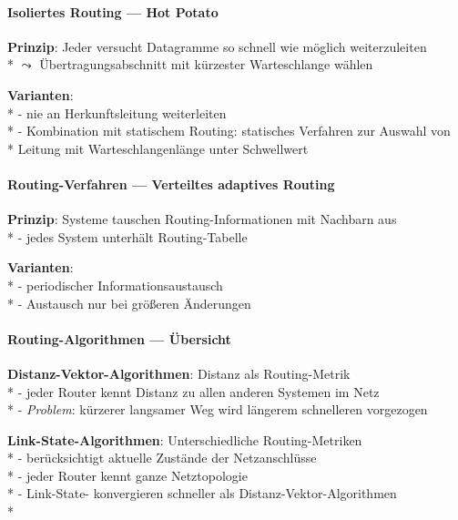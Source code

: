 \paragraph{Isoliertes Routing --- Hot Potato}
\begin{items}
  \item \textbf{Prinzip}: Jeder versucht Datagramme so schnell wie möglich weiterzuleiten \\*
    \( \leadsto \) Übertragungsabschnitt mit kürzester Warteschlange wählen
  \item \textbf{Varianten}: \\*
    - nie an Herkunftsleitung weiterleiten \\*
    - Kombination mit statischem Routing: statisches Verfahren zur Auswahl von \\* \phantom{-} \phantom{\( \cdot \)} Leitung mit Warteschlangenlänge unter Schwellwert
\end{items}

\paragraph{Routing-Verfahren --- Verteiltes adaptives Routing}
\begin{items}
  \item \textbf{Prinzip}: Systeme tauschen Routing-Informationen mit Nachbarn aus \\*
    - jedes System unterhält Routing-Tabelle
  \item \textbf{Varianten}: \\*
    - periodischer Informationsaustausch \\*
    - Austausch nur bei größeren Änderungen
\end{items}

\paragraph{Routing-Algorithmen --- Übersicht}
\begin{items}
  \item \textbf{Distanz-Vektor-Algorithmen}: Distanz als Routing-Metrik \\*
    - jeder Router kennt Distanz zu allen anderen Systemen im Netz \\*
    - \emph{Problem}: kürzerer langsamer Weg wird längerem schnelleren vorgezogen
  \item \textbf{Link-State-Algorithmen}: Unterschiedliche Routing-Metriken \\*
    - berücksichtigt aktuelle Zustände der Netzanschlüsse \\*
    - jeder Router kennt ganze Netztopologie \\*
    - Link-State- konvergieren schneller als Distanz-Vektor-Algorithmen \\* 
\end{items}

